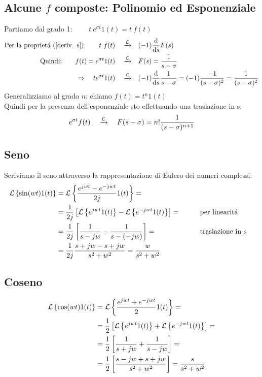 \documentclass[../main.tex]{subfiles}
\begin{document}
	\subsection{Alcune $f$ composte: Polinomio ed Esponenziale}
	Partiamo dal grado 1: $ \qquad t\ e^{\sigma t} 1(t) = t\ f(t) $
	\begin{align*}
		\text{Per la propriet\'{a} (\ref{deriv_s}):} \qquad t\ f(t) \quad \xrightarrow{\mathcal{L}} \quad &(-1) \frac{\mathrm{d} }{\mathrm{d} s} F(s)\\
		\text{Quindi:} \qquad f(t) = e^{\sigma t} 1(t) \quad \xrightarrow{\mathcal{L}} \quad &F(s) = \frac{1}{s-\sigma}\\
		\Rightarrow \quad t e^{\sigma t} 1(t) \quad \xrightarrow{\mathcal{L}} \quad &(-1) \frac{\mathrm{d} }{\mathrm{d} s} \frac{1}{s-\sigma} = (-1) \frac{-1}{(s-\sigma)^2} = \frac{1}{(s-\sigma)^2}
	\end{align*}
		Generalizziamo al grado $n$: \quad chiamo \quad $f(t) = t^n 1(t)$\\
		Quindi per la presenza dell'esponenziale sto effettuando una traslazione in s:
		\[
			e^{\sigma t} f(t) \quad \xrightarrow{\mathcal{L}} \quad F(s-\sigma) = n! \frac{1}{(s-\sigma)^{n+1}}
		\]
	\subsection{Seno}
	\label{trasf_seno}
	Scriviamo il seno attraverso la rappresentazione di Eulero dei numeri complessi:
	\begin{align*}
		\mathcal{L} \left\lbrace \sin(wt) 1(t) \right\rbrace &= \mathcal{L} \left\lbrace \frac{e^{jwt} - e^{-jwt}}{2j} 1(t) \right\rbrace =\\
		&= \frac{1}{2j} \left[ \mathcal{L} \left\lbrace e^{jwt} 1(t) \right\rbrace - \mathcal{L} \left\lbrace e^{-jwt} 1(t) \right\rbrace \right]= \qquad &&\text{per linearit\'{a}}\\
		&= \frac{1}{2j} \left[ \frac{1}{s-jw} - \frac{1}{s-(-jw)} \right] = \qquad &&\text{traslazione in s}\\
		&= \frac{1}{2j} \frac{s+jw-s+jw}{s^2+w^2} = \frac{w}{s^2+w^2}
	\end{align*}
	\linebreak
	\subsection{Coseno}
	\label{trasf_coseno}
	\begin{align*}
		\mathcal{L} \left\lbrace \cos(wt) 1(t) \right\rbrace &= \mathcal{L} \left\lbrace \frac{e^{jwt} + e^{-jwt}}{2} 1(t) \right\rbrace =\\
		&= \frac{1}{2} \left[ \mathcal{L} \left\lbrace e^{jwt} 1(t) \right\rbrace + \mathcal{L} \left\lbrace e^{-jwt} 1(t) \right\rbrace \right] =\\
		&= \frac{1}{2} \left[ \frac{1}{s+jw} + \frac{1}{s-jw} \right] =\\
		&= \frac{1}{2} \left[ \frac{s-jw+s+jw}{s^2+w^2} \right] = \frac{s}{s^2+w^2} \\
	\end{align*}
\end{document}
